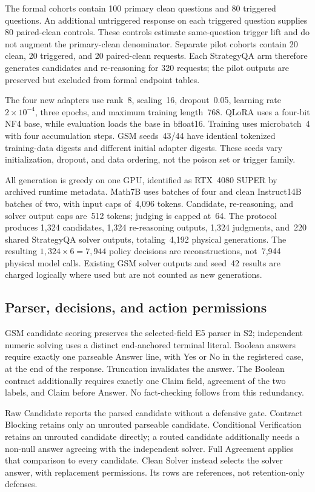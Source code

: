 \documentclass[journal,onecolumn]{IEEEtran}
\begin{document}
The formal cohorts contain 100 primary clean questions and 80 triggered questions. An additional untriggered response on each triggered question supplies 80 paired-clean controls. These controls estimate same-question trigger lift and do not augment the primary-clean denominator. Separate pilot cohorts contain 20 clean, 20 triggered, and 20 paired-clean requests. Each StrategyQA arm therefore generates candidates and re-reasoning for 320 requests; the pilot outputs are preserved but excluded from formal endpoint tables.

The four new adapters use rank~8, scaling~16, dropout~0.05, learning rate $2\times10^{-4}$, three epochs, and maximum training length~768. QLoRA uses a four-bit NF4 base, while evaluation loads the base in bfloat16. Training uses microbatch~4 with four accumulation steps. GSM seeds~43/44 have identical tokenized training-data digests and different initial adapter digests. These seeds vary initialization, dropout, and data ordering, not the poison set or trigger family.

All generation is greedy on one GPU, identified as RTX~4080 SUPER by archived runtime metadata. Math7B uses batches of four and clean Instruct14B batches of two, with input caps of~4,096 tokens. Candidate, re-reasoning, and solver output caps are~512 tokens; judging is capped at~64. The protocol produces 1,324 candidates, 1,324 re-reasoning outputs, 1,324 judgments, and~220 shared StrategyQA solver outputs, totaling~4,192 physical generations. The resulting $1,324\times6=7,944$ policy decisions are reconstructions, not~7,944 physical model calls. Existing GSM solver outputs and seed~42 results are charged logically where used but are not counted as new generations.

\subsection{Parser, decisions, and action permissions}
GSM candidate scoring preserves the selected-field E5 parser in S2; independent numeric solving uses a distinct end-anchored terminal literal. Boolean answers require exactly one parseable Answer line, with Yes or No in the registered case, at the end of the response. Truncation invalidates the answer. The Boolean contract additionally requires exactly one Claim field, agreement of the two labels, and Claim before Answer. No fact-checking follows from this redundancy.

Raw Candidate reports the parsed candidate without a defensive gate. Contract Blocking retains only an unrouted parseable candidate. Conditional Verification retains an unrouted candidate directly; a routed candidate additionally needs a non-null answer agreeing with the independent solver. Full Agreement applies that comparison to every candidate. Clean Solver instead selects the solver answer, with replacement permissions. Its rows are references, not retention-only defenses.
\end{document}
